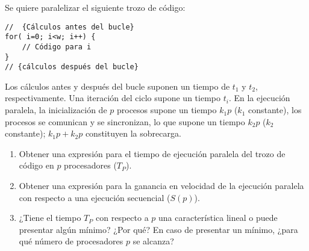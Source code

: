 \begin{ejercicio}
    Se quiere paralelizar el siguiente trozo de código:
    \begin{verbatim}
//  {Cálculos antes del bucle}
for( i=0; i<w; i++) {
    // Código para i
}
// {cálculos después del bucle}
    \end{verbatim}
    Los cálculos antes y después del bucle suponen un tiempo de $t_1$ y $t_2$, respectivamente.
    Una iteración del ciclo supone un tiempo $t_i$. En la ejecución paralela, la inicialización de $p$ procesos supone un tiempo
    $k_1p$ ($k_1$ constante), los procesos se comunican y se sincronizan, lo que supone un tiempo $k_2p$ ($k_2$ constante); $k_1p+k_2p$
    constituyen la sobrecarga.
    \begin{enumerate}
        \item Obtener una expresión para el tiempo de ejecución paralela del trozo de código en $p$ procesadores ($T_P$).
        \item Obtener una expresión para la ganancia en velocidad de la ejecución paralela con respecto a una ejecución secuencial ($S(p)$).
        \item ¿Tiene el tiempo $T_P$ con respecto a $p$ una característica lineal o puede presentar algún mínimo? ¿Por qué? En caso de presentar un mínimo, ¿para qué número de procesadores $p$ se alcanza?
    \end{enumerate}


\end{ejercicio}
